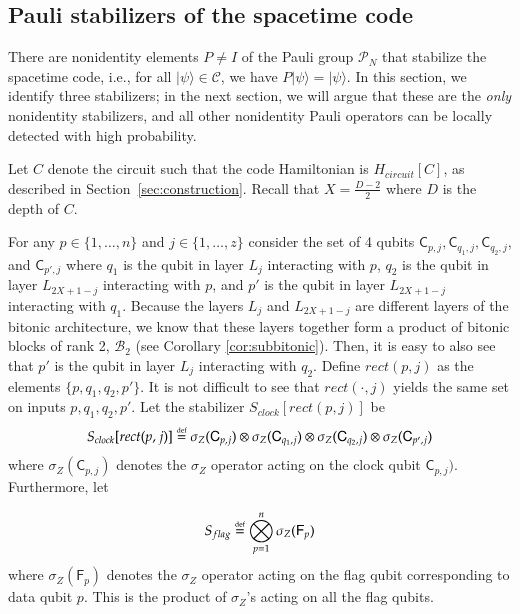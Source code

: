 \documentclass[11pt,letterpaper]{article}
\theoremstyle{definition}
\theoremstyle{remark}
\newcommand{\defeq}{\stackrel{\mbox{\normalfont\tiny def}}=}
\newcommand{\cB}{\mathcal B}
\newcommand{\cC}{\mathcal C}
\newcommand{\cP}{\mathcal P}
\numberwithin{equation}{section}
\theoremstyle{definition}
\newcommand{\ket}[1]{|#1\rangle}
\newcommand{\sC}{{\mathsf{C}}}
\newcommand{\sF}{{\mathsf{F}}}
\begin{document}
\subsection{Pauli stabilizers of the spacetime code}

There are nonidentity elements $P \neq I$ of the Pauli group $\cP_N$ that stabilize the spacetime code, i.e., for all $\ket{\psi} \in \cC$, we have $P \ket{\psi} = \ket{\psi}$. In this section, we identify three stabilizers; in the next section, we will argue that these are the \emph{only} nonidentity stabilizers, and all other nonidentity Pauli operators can be locally detected with high probability.

Let $C$ denote the circuit such that the code Hamiltonian is $H_{circuit}[C]$, as described in Section~\ref{sec:construction}. Recall that $X = \frac{D - 2}{2}$ where $D$ is the depth of $C$. 

For any $p \in \{1,\ldots,n\}$ and $j \in \{1, \ldots, z\}$ consider the set of 4 qubits $\sC_{p,j}, \sC_{q_1,j}, \sC_{q_2,j}$, and $\sC_{p',j}$ where $q_1$ is the qubit in layer $L_j$ interacting with $p$, $q_2$ is the qubit in layer $L_{2X + 1 - j}$ interacting with $p$, and $p'$ is the qubit in layer $L_{2X+1 - j}$ interacting with $q_1$. Because the layers $L_j$ and $L_{2X+1-j}$ are different layers of the bitonic architecture, we know that these layers together form a product of bitonic blocks of rank 2, $\cB_2$ (see Corollary \ref{cor:subbitonic}). Then, it is easy to also see that $p'$ is the qubit in layer $L_j$ interacting with $q_2$. Define $rect(p,j)$ as the elements $\{p,q_1, q_2, p'\}$. It is not difficult to see that $rect(\cdot,j)$ yields the same set on inputs $p, q_1, q_2, p'$. Let the stabilizer $S_{clock}[rect(p,j)]$ be
\begin{equation}
\label{eq:s_clock}
S_{clock}[rect(p,j)] \defeq \sigma_Z(\sC_{p,j}) \otimes \sigma_Z(\sC_{q_1,j}) \otimes \sigma_Z(\sC_{q_2,j}) \otimes \sigma_Z(\sC_{p',j})
\end{equation}
where $\sigma_Z(\sC_{p,j})$ denotes the $\sigma_Z$ operator acting on the clock qubit $\sC_{p,j})$.  Furthermore, let

%
%
%
%
%
%

\begin{equation}
\label{eq:s_flag}
  S_{flag} \defeq \bigotimes_{p = 1}^n \sigma_Z(\sF_p)
\end{equation}
where $\sigma_Z(\sF_p)$ denotes the $\sigma_Z$ operator acting on the flag qubit corresponding to data qubit $p$. This is the product of $\sigma_Z$'s acting on all the flag qubits.
\end{document}
